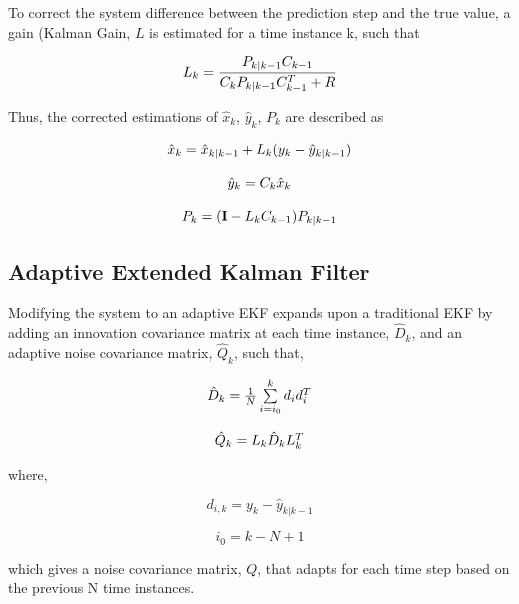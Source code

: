 \documentclass[12pt]{article}
\begin{document}
To correct the system difference between the prediction step and the true value, a gain (Kalman Gain, $L$ is estimated for a time instance k, such that 

\begin{equation}
\centering
L_{k} = \frac{P_{k|k-1} C_{k-1}}{C_k P_{k|k-1} C_{k-1}^T + R}
\end{equation}

Thus, the corrected estimations of $\hat{x}_k$, $\hat{y}_k$, $P_{k}$ are described as 

\begin{equation}
\centering
\begin{matrix}
	\hat{x}_k = \hat{x}_{k|k-1} + L_{k}(y_{k} - \hat{y}_{k|k-1}) \\ \\
	\hat{y}_k = C_k\hat{x}_k \\ \\
	P_{k} = (\bold{I} - L_k C_{k-1})P_{k|k-1}
\end{matrix}
\end{equation}

\subsection{Adaptive Extended Kalman Filter}

\par
Modifying the system to an adaptive EKF expands upon a traditional EKF by adding an innovation covariance matrix at each time instance, $\hat{D}_k$, and an adaptive noise covariance matrix, $\hat{Q}_k$, such that,

\begin{equation}
\centering
\begin{matrix}
	\hat{D}_k = \frac{1}{N}\sum\limits_{i=i_0}^{k} d_i d_i^T \\ \\ 
	\hat{Q}_k = L_k \hat{D}_k L_k^T
\end{matrix}
\end{equation}

where,

\begin{equation}
d_{i,k}= y_k - \hat{y}_{k|k-1}
\end{equation}

\begin{equation}
i_0 = k - N + 1
\end{equation}

which gives a noise covariance matrix, $Q$, that adapts for each time step based on the previous N time instances. 
\end{document}
